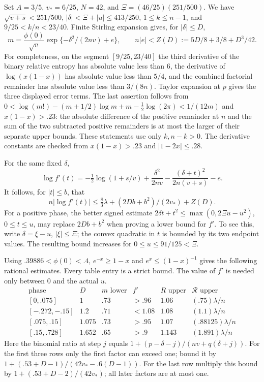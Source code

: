\documentclass[11pt]{article}
\begin{document}
Set $A=3/5$, $v_*=6/25$, $N=42$, and
$\Xi=(46/25)(251/500)$. We have $\sqrt{v+s}<251/500$,
$|\delta|<\Xi+|u|\le413/250$, $1\le k\le n-1$, and
$9/25<k/n<23/40$. Finite Stirling expansion gives, for $|\delta|\le D$,
\begin{equation}\label{eq:stirling}
 m=\frac{\phi(0)}{\sqrt v}
       \exp\{-\delta^2/(2nv)+e\},\qquad
 n|e|<Z(D):=5D/8+3/8+D^3/42.
\end{equation}
For completeness, on the segment $[9/25,23/40]$ the third derivative
of the binary relative entropy has absolute value less than $6$,
the derivative of $\log(x(1-x))$ has absolute value less than $5/4$,
and the combined factorial remainder has absolute value less than
$3/(8n)$. Taylor expansion at $p$ gives the three displayed error
terms. The last assertion follows from
$0<\log(m!)-(m+1/2)\log m+m-\tfrac12\log(2\pi)<1/(12m)$
and $x(1-x)>.23$: the absolute difference of the positive remainder
at $n$ and the sum of the two subtracted positive remainders is at
most the larger of their separate upper bounds.
These statements use only $k,n-k>0$. The derivative constants are
checked from $x(1-x)>.23$ and $|1-2x|\le.28$.

For the same fixed $\delta$,
\[
 \log f'(t)=-\tfrac12\log(1+s/v)+\frac{\delta^2}{2nv}
       -\frac{(\delta+t)^2}{2n(v+s)}-e.
\]
It follows, for $|t|\le b$, that
\begin{equation}\label{eq:log}
 n|\log f'(t)|\le\tfrac83\lambda+(2Db+b^2)/(2v_*)+Z(D).
\end{equation}
For a positive phase, the better signed estimate
$2\delta t+t^2\le\max(0,2\Xi u-u^2)$, $0\le t\le u$, may
replace $2Db+b^2$ when proving a lower bound for $f'$.
To see this, write $\delta=\xi-u$, $|\xi|\le\Xi$; the convex
quadratic in $t$ is bounded by its two endpoint values. The resulting
bound increases for $0\le u\le91/125<\Xi$.

Using $.39886<\phi(0)<.4$, $e^{-x}\ge1-x$ and
$e^x\le(1-x)^{-1}$ gives the following rational estimates.
Every table entry is a strict bound.
The value of $f'$ is needed only between $0$ and the actual $u$.
\[
\begin{array}{c|c|c|c|c|c}
 \text{phase}&D&m\text{ lower}&f'&R\text{ upper}&\mathcal R\text{ upper}\\\hline
 {[0,.075]}&1&.73&>.96&1.06&(.75)\lambda/n\\
 {[-.272,-.15]}&1.2&.71&<1.08&1.08&(1.1)\lambda/n\\
 {[.075,.15]}&1.075&.73&>.95&1.07&(.88125)\lambda/n\\
 {[.15,.728]}&1.652&.65&>.9&1.143&(1.891)\lambda/n
\end{array}
\]
Here the binomial ratio at step $j$ equals
$1+(p-\delta-j)/(nv+q(\delta+j))$.
For the first three rows only the first factor can exceed one;
bound it by
$1+(.53+D-1)/(42v_*-.6(D-1))$.
For the last row multiply this bound by
$1+(.53+D-2)/(42v_*)$; all later factors are at most one.
\end{document}
